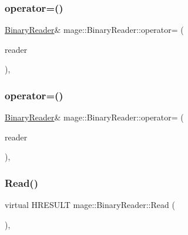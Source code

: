 \hypertarget{classmage_1_1_binary_reader_a0408bb456983b4a03ae42ab69c6f4bc3}{}\label{classmage_1_1_binary_reader_a0408bb456983b4a03ae42ab69c6f4bc3} 
\subsubsection{\texorpdfstring{operator=()}{operator=()}\hspace{0.1cm}{\footnotesize\ttfamily [1/2]}}
{\footnotesize\ttfamily \hyperlink{classmage_1_1_binary_reader}{Binary\+Reader}\& mage\+::\+Binary\+Reader\+::operator= (\begin{DoxyParamCaption}\item[{const \hyperlink{classmage_1_1_binary_reader}{Binary\+Reader} \&}]{reader }\end{DoxyParamCaption})\hspace{0.3cm}{\ttfamily [private]}, {\ttfamily [delete]}}

\hypertarget{classmage_1_1_binary_reader_abb971fe92727a0e86b3698dba8c586de}{}\label{classmage_1_1_binary_reader_abb971fe92727a0e86b3698dba8c586de} 
\subsubsection{\texorpdfstring{operator=()}{operator=()}\hspace{0.1cm}{\footnotesize\ttfamily [2/2]}}
{\footnotesize\ttfamily \hyperlink{classmage_1_1_binary_reader}{Binary\+Reader}\& mage\+::\+Binary\+Reader\+::operator= (\begin{DoxyParamCaption}\item[{\hyperlink{classmage_1_1_binary_reader}{Binary\+Reader} \&\&}]{reader }\end{DoxyParamCaption})\hspace{0.3cm}{\ttfamily [private]}, {\ttfamily [delete]}}

\hypertarget{classmage_1_1_binary_reader_a000cf97b640a5fbd1d5c33ccaae7fb39}{}\label{classmage_1_1_binary_reader_a000cf97b640a5fbd1d5c33ccaae7fb39} 
\subsubsection{\texorpdfstring{Read()}{Read()}}
{\footnotesize\ttfamily virtual H\+R\+E\+S\+U\+LT mage\+::\+Binary\+Reader\+::\+Read (\begin{DoxyParamCaption}{ }\end{DoxyParamCaption})\hspace{0.3cm}{\ttfamily [protected]}, {}}

